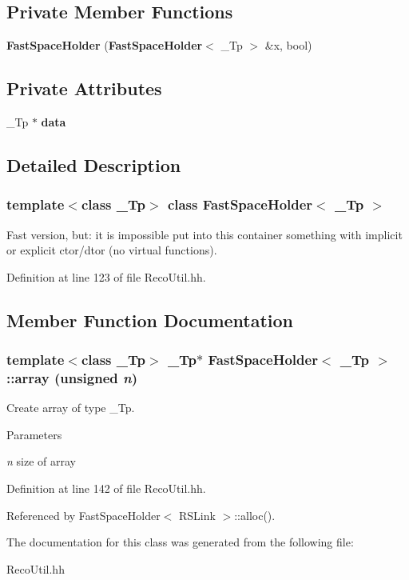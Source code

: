 \subsection*{Private Member Functions}
\begin{DoxyCompactItemize}
\item 
{\bfseries FastSpaceHolder} ({\bf FastSpaceHolder}$<$ \_\-Tp $>$ \&x, bool)\label{classFastSpaceHolder_a8d48587881491d4aa72aad07e5899a2e}

\end{DoxyCompactItemize}
\subsection*{Private Attributes}
\begin{DoxyCompactItemize}
\item 
\_\-Tp $\ast$ {\bfseries data}\label{classFastSpaceHolder_abb9b40a2bbb5b57766b28c406af250f9}

\end{DoxyCompactItemize}


\subsection{Detailed Description}
\subsubsection*{template$<$class \_\-Tp$>$ class FastSpaceHolder$<$ \_\-Tp $>$}

Fast version, but: it is impossible put into this container something with implicit or explicit ctor/dtor (no virtual functions). 

Definition at line 123 of file RecoUtil.hh.

\subsection{Member Function Documentation}
\subsubsection[{array}]{\setlength{\rightskip}{0pt plus 5cm}template$<$class \_\-Tp$>$ \_\-Tp$\ast$ {\bf FastSpaceHolder}$<$ \_\-Tp $>$::array (unsigned {\em n})\hspace{0.3cm}{\ttfamily  [inline]}}\label{classFastSpaceHolder_abbfd87752276f2833ed20a1410bfaa74}


Create array of type \_\-Tp. 
\begin{DoxyParams}{Parameters}
\item[{\em n}]size of array \end{DoxyParams}


Definition at line 142 of file RecoUtil.hh.

Referenced by FastSpaceHolder$<$ RSLink $>$::alloc().

The documentation for this class was generated from the following file:\begin{DoxyCompactItemize}
\item 
RecoUtil.hh\end{DoxyCompactItemize}

